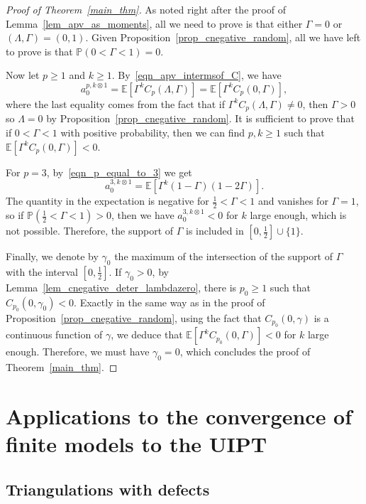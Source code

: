 \documentclass[10pt]{amsart}
\theoremstyle{definition}\newtheorem{defi}[theo]{Definition}\newtheorem{rema}[theo]{Remark}\newtheorem{exam}[theo]{Example}\newtheorem{exem}[theo]{Example}\newtheorem{nota}[theo]{Notation}
\newcommand{\E}{\mathbb{E}}
\renewcommand{\P}{\mathbb{P}}
\begin{document}
\begin{proof}[Proof of Theorem~\ref{main_thm}]
As noted right after the proof of Lemma~\ref{lem_apv_as_moments}, all we need to prove is that either $\Gamma=0$ or $(\Lambda, \Gamma)=(0,1)$. Given Proposition~\ref{prop_cnegative_random}, all we have left to prove is that $\P \left(0<\Gamma<1 \right)=0$.

Now let $p \geq 1$ and $k \geq 1$. By~\eqref{eqn_apv_intermsof_C}, we have
\[
a_0^{p, k \otimes 1} = \E \left[\Gamma^{k} C_p(\Lambda, \Gamma) \right] = \E \left[\Gamma^{k} C_p(0, \Gamma) \right],
\]
where the last equality comes from the fact that if $\Gamma^{k} C_p(\Lambda, \Gamma) \ne 0$, then $\Gamma>0$ so $\Lambda=0$ by Proposition~\ref{prop_cnegative_random}. It is sufficient to prove that if $0<\Gamma<1$ with positive probability, then we can find $p,k \geq 1$ such that $\E [\Gamma^{k} C_p(0, \Gamma)]<0$.

For $p=3$, by~\eqref{eqn_p_equal_to_3} we get
\[
a_0^{3, k \otimes 1} = \E \left[\Gamma^{k} (1-\Gamma)(1-2\Gamma) \right].
\]
The quantity in the expectation is negative for $\frac{1}{2}<\Gamma<1$ and vanishes for $\Gamma=1$, so if $\P (\frac{1}{2} < \Gamma < 1 )>0$, then we have $a_0^{3, k \otimes 1}<0$ for $k$ large enough, which is not possible. Therefore, the support of $\Gamma$ is included in $[0,\frac{1}{2}] \cup \{1\}$.

Finally, we denote by $\gamma_0$ the maximum of the intersection of the support of $\Gamma$ with the interval $[0,\frac{1}{2}]$. If $\gamma_0>0$, by Lemma~\ref{lem_cnegative_deter_lambdazero}, there is $p_0 \geq 1$ such that $C_{p_0}(0,\gamma_0)<0$. Exactly in the same way as in the proof of Proposition~\ref{prop_cnegative_random}, using the fact that $C_{p_0}(0,\gamma)$ is a continuous function of $\gamma$, we deduce that $\E [\Gamma^{k} C_{p_0}(0, \Gamma)]<0$ for $k$ large enough. Therefore, we must have $\gamma_0=0$, which concludes the proof of Theorem~\ref{main_thm}.
\end{proof}

\section{Applications to the convergence of finite models to the UIPT}

\subsection{Triangulations with defects}
\end{document}
